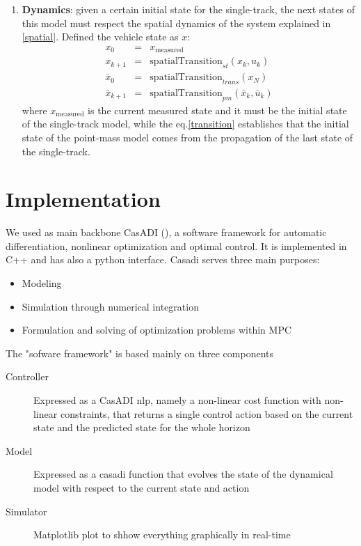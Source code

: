 \documentclass[a4paper, onecolumn, 12pt]{article}
\begin{document}
\begin{enumerate}
    \item \textbf{Dynamics}: given a certain initial state for the single-track, the next states of this model must respect the
    spatial dynamics of the system explained in \ref{spatial}. Defined the vehicle state as $x$:
    \begin{eqnarray}
        x_0 &=& x_{\text{measured}} \\
        x_{k+1} &=& \text{spatialTransition}_{st}(x_k, u_k) \\
        \bar{x}_0 &=& \text{spatialTransition}_{trans}(x_N) \label{transition}\\
        \bar{x}_{k+1} &=& \text{spatialTransition}_{pm}(\bar{x}_k, \bar{u}_k)
    \end{eqnarray}
    where $x_{\text{measured}}$ is the current measured state and it must be the initial state of the single-track model,
    while the eq.\ref{transition} establishes that the initial state of the point-mass model comes from the propagation of 
    the last state of the single-track.
\end{enumerate}


\section{Implementation}

We used as main backbone CasADI (\cite{casadi}), a software framework for automatic
differentiation, nonlinear optimization and optimal control. It is implemented
in C++ and has also a python interface. Casadi serves three main purposes:
\begin{itemize}
    \item Modeling
    \item Simulation through numerical integration
    \item Formulation and solving of optimization problems within MPC
\end{itemize}
The "sofware framework" is based mainly on three components
\begin{description}
    \item[Controller] Expressed as a CasADI nlp, namely a non-linear cost
    function with non-linear constraints, that returns a single control action
    based on the current state and the predicted state for the whole horizon
    \item[Model] Expressed as a casadi function that evolves the
    state of the dynamical model with respect to the current state and action
    \item[Simulator] Matplotlib plot to shhow everything graphically in real-time
\end{description}
\end{document}
